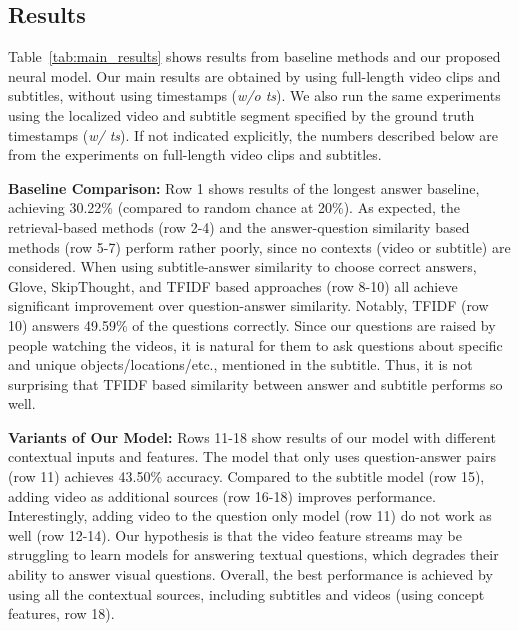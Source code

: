 \documentclass[11pt,a4paper]{article}
\begin{document}
\subsection{Results}

Table~\ref{tab:main_results} shows results from baseline methods and our proposed neural model. 
Our main results are obtained by using full-length video clips and subtitles, without using timestamps (\textit{w/o ts}). 
We also run the same experiments using the localized video and subtitle segment specified by the ground truth timestamps (\textit{w/ ts}). 
If not indicated explicitly, the numbers described below are from the experiments on full-length video clips and subtitles.

\noindent\textbf{Baseline Comparison:} Row 1 shows results of the longest answer baseline, achieving 30.22\% (compared to random chance at 20\%). As expected, the retrieval-based methods (row 2-4) and the answer-question similarity based methods (row 5-7) perform rather poorly, since no contexts (video or subtitle) are considered. 
When using subtitle-answer similarity to choose correct answers, Glove, SkipThought, and TFIDF based approaches (row 8-10) all achieve significant improvement over question-answer similarity. 
Notably, TFIDF (row 10) answers 49.59\% of the questions correctly. 
Since our questions are raised by people watching the videos, it is natural for them to ask questions about specific and unique objects/locations/etc., mentioned in the subtitle. Thus, it is not surprising that TFIDF based similarity between answer and subtitle performs so well.

\noindent\textbf{Variants of Our Model:} Rows 11-18 show results of our model with different contextual inputs and features. The model that only uses question-answer pairs (row 11) achieves 43.50\% accuracy. Compared to the subtitle model (row 15), adding video as additional sources (row 16-18) improves performance. 
Interestingly, adding video to the question only model (row 11) do not work as well (row 12-14).
Our hypothesis is that the video feature streams may be struggling to learn models for answering textual questions, which degrades their ability to answer visual questions. Overall, the best performance is achieved by using all the contextual sources, including subtitles and videos (using concept features, row 18).
\end{document}
